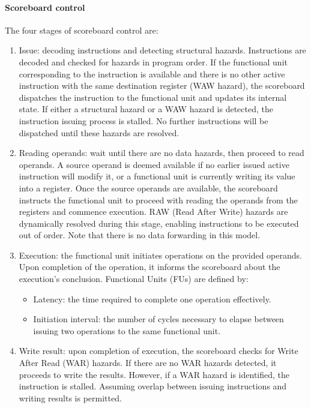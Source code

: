 \paragraph*{Scoreboard control}
The four stages of scoreboard control are: 
\begin{enumerate}
    \item Issue: decoding instructions and detecting structural hazards.
        Instructions are decoded and checked for hazards in program order.
        If the functional unit corresponding to the instruction is available and there is no other active instruction with the same destination register (WAW hazard), the scoreboard dispatches the instruction to the functional unit and updates its internal state.
        If either a structural hazard or a WAW hazard is detected, the instruction issuing process is stalled. 
        No further instructions will be dispatched until these hazards are resolved.
    \item Reading operands: wait until there are no data hazards, then proceed to read operands.
        A source operand is deemed available if no earlier issued active instruction will modify it, or a functional unit is currently writing its value into a register.
        Once the source operands are available, the scoreboard instructs the functional unit to proceed with reading the operands from the registers and commence execution.
        RAW (Read After Write) hazards are dynamically resolved during this stage, enabling instructions to be executed out of order. 
        Note that there is no data forwarding in this model.
    \item Execution: the functional unit initiates operations on the provided operands.
        Upon completion of the operation, it informs the scoreboard about the execution's conclusion.
        Functional Units (FUs) are defined by:
        \begin{itemize}
            \item Latency: the time required to complete one operation effectively.
            \item Initiation interval: the number of cycles necessary to elapse between issuing two operations to the same functional unit.
        \end{itemize}
    \item Write result: upon completion of execution, the scoreboard checks for Write After Read (WAR) hazards. 
        If there are no WAR hazards detected, it proceeds to write the results. 
        However, if a WAR hazard is identified, the instruction is stalled.
        Assuming overlap between issuing instructions and writing results is permitted.
\end{enumerate}

